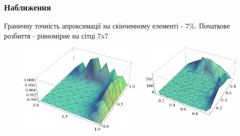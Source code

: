 \begin{frame}[allowframebreaks]
	\frametitle<presentation>{Наближення}

	Граничну точність апроксимації на скінченному елементі - 7\%.
	Початкове розбиття - рівномірне на сітці 7x7


		\begin{figure}[H]
			 \begin{columns}
			 	\begin{column}{0.5\textwidth}
		     		\includegraphics[width=\textwidth]{problem2/my/solutions/solution1}
		     	\end{column}
		     	\begin{column}{0.5\textwidth}
		     		\includegraphics[width=\textwidth]{problem2/my/AEE/aee1}

\end{column}
\end{columns}
\end{figure}
\end{frame}
